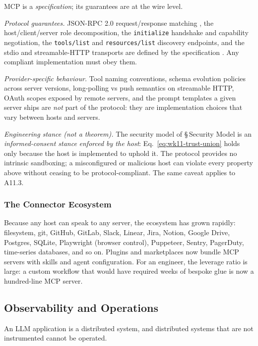\begin{provedassumed}
MCP is a \emph{specification}; its guarantees are at the wire
level.

\emph{Protocol guarantees.} JSON-RPC 2.0 request/response
matching \citep{json_rpc_spec}, the host/client/server role
decomposition, the \texttt{initialize} handshake and capability
negotiation, the \texttt{tools/list} and
\texttt{resources/list} discovery endpoints, and the stdio and
streamable-HTTP transports are defined by the specification
\citep{mcp_spec}. Any compliant implementation must obey them.

\emph{Provider-specific behaviour.} Tool naming conventions,
schema evolution policies across server versions, long-polling
vs push semantics on streamable HTTP, OAuth scopes exposed by
remote servers, and the prompt templates a given server ships
are \emph{not} part of the protocol: they are implementation
choices that vary between hosts and servers.

\emph{Engineering stance (not a theorem).} The security model
of \S\,Security Model is an \emph{informed-consent stance}
\emph{enforced by the host}: Eq.~\eqref{eq:wk11-trust-union} holds
only because the host is implemented to uphold it. The protocol
provides no intrinsic sandboxing; a misconfigured or malicious
host can violate every property above without ceasing to be
protocol-compliant. The same caveat applies to A11.3.
\end{provedassumed}

\subsubsection{The Connector Ecosystem}

Because any host can speak to any server, the ecosystem has
grown rapidly: filesystem, git, GitHub, GitLab, Slack, Linear,
Jira, Notion, Google Drive, Postgres, SQLite, Playwright (browser
control), Puppeteer, Sentry, PagerDuty, time-series databases,
and so on. Plugins and marketplaces now bundle MCP servers with
skills and agent configuration. For an engineer, the leverage
ratio is large: a custom workflow that would have required weeks
of bespoke glue is now a hundred-line MCP server.

\subsection{Observability and Operations}

An LLM application is a distributed system, and distributed
systems that are not instrumented cannot be operated.

